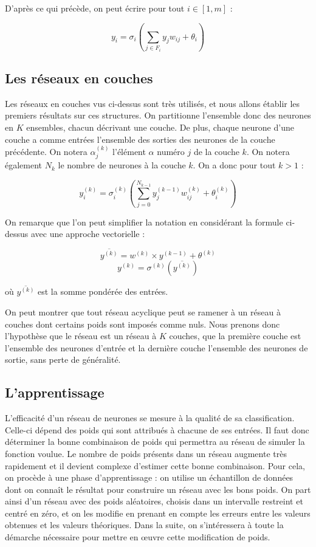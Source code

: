 \medskip

D'après ce qui précède, on peut écrire pour tout $i \in [1, m]$ :

\[y_i = \sigma_i(\sum_{j \in F_i} y_jw_{ij} + \theta_i) \]

\subsection{Les réseaux en couches}

Les réseaux en couches vus ci-dessus sont très utilisés, et nous allons établir
les premiers résultats sur ces structures. On partitionne l'ensemble donc
des neurones en $K$ ensembles, chacun décrivant une couche. De plus,
chaque neurone d'une couche a comme entrées l'ensemble des sorties
des neurones de la couche précédente. On notera $\alpha^{(k)}_j$ l'élément $\alpha$
numéro $j$ de la couche $k$. On notera également $N_k$ le nombre de neurones à
la couche $k$. On a donc pour tout $k > 1$ :

\[y_i^{(k)} = \sigma_i^{(k)}(\sum_{j = 0}^{N_{k-1}} y_j^{(k-1)}w_{ij}^{(k)} + \theta_i^{(k)}) \]

On remarque que l'on peut simplifier la notation en considérant la formule
ci-dessus avec une approche vectorielle :

\[\overline{y^{(k)}} = w^{(k)} \times y^{(k-1)} + \theta^{(k)}\]
\[y^{(k)} = \sigma^{(k)}(\overline{y^{(k)}}) \]

où $\overline{y^{(k)}}$ est la somme pondérée des entrées.

On peut montrer que tout réseau acyclique peut se ramener à un réseau à couches
dont certains poids sont imposés comme nuls. Nous prenons donc l'hypothèse que
le réseau est un réseau à $K$ couches, que la première couche est l'ensemble des
 neurones d'entrée et la dernière couche l'ensemble des neurones de sortie, sans
 perte de généralité.

\subsection{L'apprentissage}

L'efficacité d'un réseau de neurones se mesure à la qualité de sa classification. 
Celle-ci dépend des poids qui sont attribués à chacune de ses entrées. Il faut
donc déterminer la bonne combinaison de poids qui permettra au réseau de
simuler la fonction voulue. Le nombre de poids présents dans un réseau augmente
très rapidement et il devient complexe d'estimer cette bonne combinaison. Pour
cela, on procède à une phase d'apprentissage : on utilise un échantillon de
données dont on connaît le résultat pour construire un réseau avec les bons poids.
On part ainsi d'un réseau avec des poids aléatoires, choisis dans un
intervalle restreint et centré en zéro, et on les modifie en prenant en compte
les erreurs entre les valeurs obtenues et les valeurs théoriques. Dans la suite,
on s'intéressera à toute la démarche nécessaire pour mettre en œuvre cette
modification de poids.

